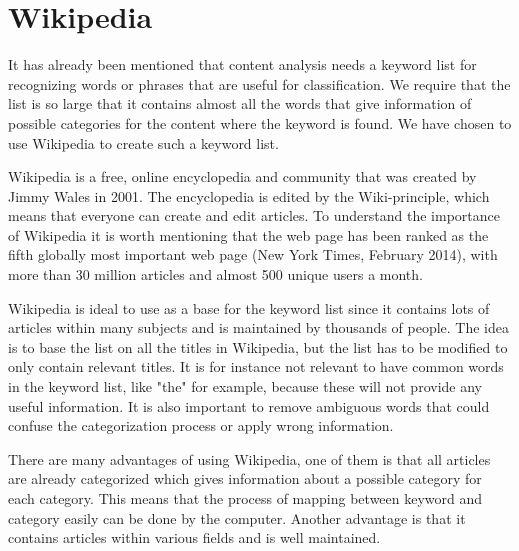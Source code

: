 \documentclass[english,a4paper]{ifimaster}
\begin{document}



\chapter{Wikipedia}
It has already been mentioned that content analysis needs a keyword list for recognizing words or phrases that are useful for classification. We require that the list is so large that it contains almost all the words that give information of possible categories for the content where the keyword is found.  We have chosen to use Wikipedia to create such a keyword list. 

Wikipedia is a free, online encyclopedia and community that was created by Jimmy Wales in 2001. The encyclopedia is edited by the Wiki-principle, which means that everyone can create and edit articles. To understand the importance of Wikipedia it is worth mentioning that the web page has been ranked as the fifth globally most important web page (New York Times, February 2014), with more than  30 million articles and almost 500 unique users a month. 

Wikipedia is ideal to use as a base for the keyword list since it contains lots of articles within many subjects and is maintained by thousands of people. The idea is to base the list on all the titles in Wikipedia, but the list has to be modified to only contain relevant titles. It is for instance not relevant to have common words in the keyword list, like "the" for example, because these will not provide any useful information. It is also important to remove ambiguous words that could confuse the categorization process or apply wrong information. 

There are many advantages of using Wikipedia, one of them is that all articles are already categorized which gives information about a possible category for each category. This means that the process of mapping between keyword and category  easily can be done by the computer. Another advantage is that it contains articles within various fields and is well maintained.
\end{document}
